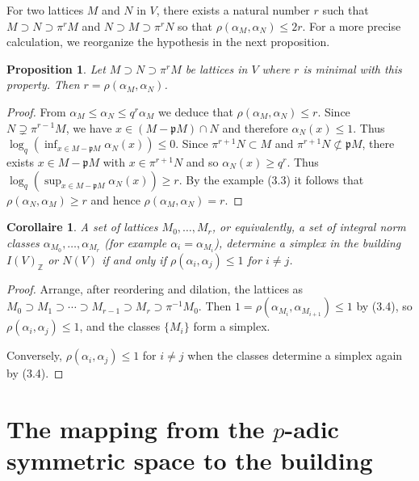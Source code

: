 \documentclass[12pt,a4paper]{article}
\theoremstyle{plain}
\newtheorem{proposition}{Proposition}[section]
\newtheorem{corollary}{Corollaire}[section]
\theoremstyle{definition}
\theoremstyle{remark}
\begin{document}
For two lattices $M$ and $N$ in $V$, there exists a natural number $r$ such 
that $M \supset N \supset \pi^r M$ and $N \supset M \supset \pi^r N$ so that 
$\rho(\alpha_M, \alpha_N) \leqslant 2r$. For a more precise calculation, we 
reorganize the hypothesis in the next proposition.

\begin{proposition}
Let $M \supset N \supset \pi^r M$ be lattices in $V$ where $r$ is minimal with 
this property. Then $r = \rho(\alpha_M, \alpha_N)$.
\end{proposition}

\begin{proof}
From $\alpha_M \leqslant \alpha_N \leqslant q^r\alpha_M$ we deduce that 
$\rho(\alpha_M, \alpha_N) \leqslant r$. Since $N \supsetneq \pi^{r-1}M$, we have 
$x \in (M - \mathfrak{p}M) \cap N$ and therefore $\alpha_N(x) \leqslant 1$. Thus 
$\log_q(\inf_{x \in M-\mathfrak{p}M} \alpha_N(x)) \leqslant 0$. Since 
$\pi^{r+1}N \subset M$ and $\pi^{r+1}N \not\subset \mathfrak{p}M$, there exists 
$x \in M - \mathfrak{p}M$ with $x \in \pi^{r+1}N$ and so $\alpha_N(x) \geqslant q^r$. 
Thus $\log_q(\sup_{x \in M-\mathfrak{p}M} \alpha_N(x)) \geqslant r$. By the example 
(3.3) it follows that $\rho(\alpha_N, \alpha_M) \geqslant r$ and hence 
$\rho(\alpha_M, \alpha_N) = r$.
\end{proof}

\begin{corollary}
A set of lattices $M_0, \ldots, M_r$, or equivalently, a set of integral 
norm classes $\alpha_{M_0}, \ldots, \alpha_{M_r}$ (for example 
$\alpha_i = \alpha_{M_i}$), determine a simplex in the building 
$I(V)_\mathbb{Z}$ or $N(V)$ if and only if $\rho(\alpha_i, \alpha_j) \leqslant 1$ 
for $i \neq j$.
\end{corollary}

\begin{proof}
Arrange, after reordering and dilation, the lattices as 
$M_0 \supset M_1 \supset \cdots \supset M_{r-1} \supset M_r \supset \pi^{-1} M_0$. Then 
$1 = \rho(\alpha_{M_i}, \alpha_{M_{i+1}}) \leqslant 1$ by (3.4), so 
$\rho(\alpha_i, \alpha_j) \leqslant 1$, and the classes $\{M_i\}$ form a simplex.

Conversely, $\rho(\alpha_i, \alpha_j) \leqslant 1$ for $i \neq j$ when the 
classes determine a simplex again by (3.4).
\end{proof}


\section{The mapping from the $p$-adic symmetric space to the building}
\end{document}
